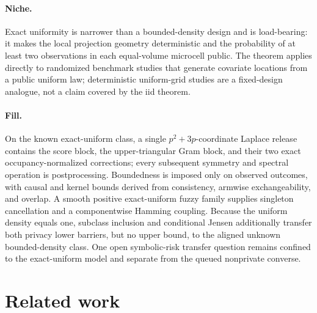 \documentclass{article}
\begin{document}
\paragraph{Niche.} Exact uniformity is narrower than a bounded-density design and is load-bearing: it makes the local projection geometry deterministic and the probability of at least two observations in each equal-volume microcell public. The theorem applies directly to randomized benchmark studies that generate covariate locations from a public uniform law; deterministic uniform-grid studies are a fixed-design analogue, not a claim covered by the iid theorem.

\paragraph{Fill.} On the known exact-uniform class, a single \(p^2+3p\)-coordinate Laplace release contains the score block, the upper-triangular Gram block, and their two exact occupancy-normalized corrections; every subsequent symmetry and spectral operation is postprocessing. Boundedness is imposed only on observed outcomes, with causal and kernel bounds derived from consistency, armwise exchangeability, and overlap. A smooth positive exact-uniform fuzzy family supplies singleton cancellation and a componentwise Hamming coupling. Because the uniform density equals one, subclass inclusion and conditional Jensen additionally transfer both privacy lower barriers, but no upper bound, to the aligned unknown bounded-density class. One open symbolic-risk transfer question remains confined to the exact-uniform model and separate from the queued nonprivate converse.

\section{Related work}
\end{document}
